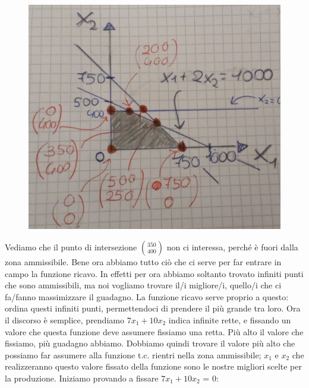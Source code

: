 \documentclass{article}
\begin{document}
\begin{figure}[h!]
    \centering
    \includegraphics[scale=0.3]{retta3.jpeg}
\end{figure}
Vediamo che il punto di intersezione $\binom{350}{400}$ non ci interessa, perché è fuori dalla zona ammissibile. Bene ora abbiamo tutto ciò che ci serve per far entrare in campo la funzione ricavo. In effetti per ora abbiamo soltanto trovato infiniti punti che sono ammissibili, ma noi vogliamo trovare il/i migliore/i, quello/i che ci fa/fanno massimizzare il guadagno. La funzione ricavo serve proprio a questo: ordina questi infiniti punti, permettendoci di prendere il più grande tra loro. Ora il discorso è semplice, prendiamo  $7x_1 + 10x_2$ indica infinite rette, e fissando un valore che questa funzione deve assumere fissiamo una retta. Più alto il valore che fissiamo, più guadagno abbiamo. Dobbiamo quindi trovare il valore più alto che possiamo far assumere alla funzione t.c. rientri nella zona ammissibile; $x_1$ e $x_2$ che realizzeranno questo valore fissato della funzione sono le nostre migliori scelte per la produzione. Iniziamo provando a fissare $7x_1 + 10x_2$ = 0:
\end{document}
